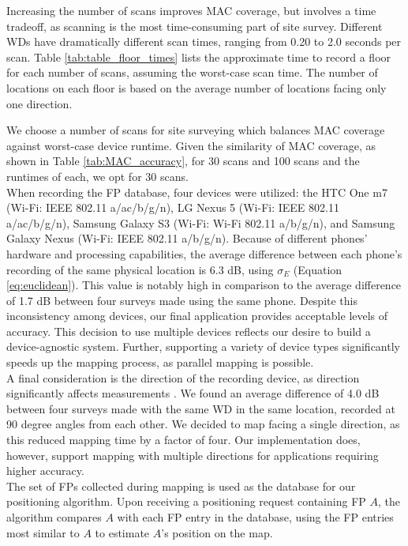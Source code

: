 \documentclass[conference]{IEEEtran}
\begin{document}
\indent Increasing the number of scans improves MAC coverage, but involves a time tradeoff, as scanning is the most time-consuming part of site survey. Different WDs have dramatically different scan times, ranging from 0.20 to 2.0 seconds per scan. Table \ref{tab:table_floor_times} lists the approximate time to record a floor for each number of scans, assuming the worst-case scan time. The number of locations on each floor is based on the average number of locations facing only one direction.

\indent We choose a number of scans for site surveying which balances MAC coverage against worst-case device runtime. Given the similarity of MAC coverage, as shown in Table \ref{tab:MAC_accuracy}, for 30 scans and 100 scans and the runtimes of each, we opt for 30 scans.\\
\indent When recording the FP database, four devices were utilized: the HTC One m7 (Wi-Fi: IEEE 802.11 a/ac/b/g/n), LG Nexus 5  (Wi-Fi: IEEE 802.11 a/ac/b/g/n), Samsung Galaxy S3 (Wi-Fi: Wi-Fi 802.11 a/b/g/n), and Samsung Galaxy Nexus (Wi-Fi: IEEE 802.11 a/b/g/n). Because of different phones' hardware and processing capabilities, the average difference between each phone's recording of the same physical location is 6.3 dB, using $\sigma_E$ (Equation \ref{eq:euclidean}). This value is notably high in comparison to the average difference of 1.7 dB between four surveys made using the same phone. Despite this inconsistency among devices, our final application provides acceptable levels of accuracy. This decision to use multiple devices reflects our desire to build a device-agnostic system. Further, supporting a variety of device types significantly speeds up the mapping process, as parallel mapping is possible.\\
\indent A final consideration is the direction of the recording device, as direction significantly affects measurements \cite{Sayad}. We found an average difference of 4.0 dB between four surveys made with the same WD in the same location, recorded at 90 degree angles from each other. We decided to map facing a single direction, as this reduced mapping time by a factor of four. Our implementation does, however, support mapping with multiple directions for applications requiring higher accuracy.\\
\indent The set of FPs collected during mapping is used as the database for our positioning algorithm. Upon receiving a positioning request containing FP $A$, the algorithm compares $A$ with each FP entry in the database, using the FP entries most similar to $A$ to estimate $A$'s position on the map.
\end{document}
